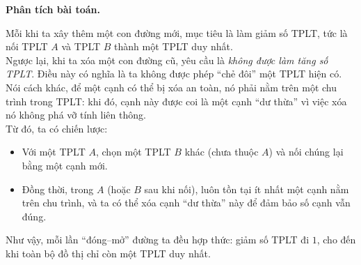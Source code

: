 \textbf{Phân tích bài toán.}

Mỗi khi ta xây thêm một con đường mới, mục tiêu là làm giảm số TPLT, tức là nối TPLT $A$ và TPLT $B$ thành một TPLT duy nhất. \\

Ngược lại, khi ta xóa một con đường cũ, yêu cầu là \textit{không được làm tăng số TPLT}. 
Điều này có nghĩa là ta không được phép ``chẻ đôi'' một TPLT hiện có. 
Nói cách khác, để một cạnh có thể bị xóa an toàn, nó phải nằm trên một chu trình trong TPLT: 
khi đó, cạnh này được coi là một cạnh ``dư thừa'' vì việc xóa nó không phá vỡ tính liên thông. \\

Từ đó, ta có chiến lược: 
\begin{itemize}
    \item Với một TPLT $A$, chọn một TPLT $B$ khác (chưa thuộc $A$) và nối chúng lại bằng một cạnh mới.
    \item Đồng thời, trong $A$ (hoặc $B$ sau khi nối), luôn tồn tại ít nhất một cạnh nằm trên chu trình, 
    và ta có thể xóa cạnh ``dư thừa'' này để đảm bảo số cạnh vẫn đúng.
\end{itemize}

Như vậy, mỗi lần ``đóng–mở'' đường ta đều hợp thức: giảm số TPLT đi $1$, 
cho đến khi toàn bộ đồ thị chỉ còn một TPLT duy nhất. \\

